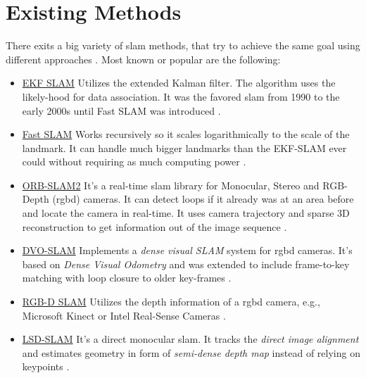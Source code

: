 \section{Existing Methods}
There exits a big variety of \gls{slam} methods, that try to achieve the same goal using different approaches \cite{openslam}.
Most known or popular are the following:
\begin{itemize}
    \item \underline{EKF SLAM} \newline
    Utilizes the extended Kalman filter. The algorithm  uses the likely-hood for data association.
    It was the favored \gls{slam} from 1990 to the early 2000s until Fast SLAM was introduced \cite{Fastslam}. 
    
    \item \underline{Fast SLAM} \newline
    Works recursively so it scales logarithmically to the scale of the landmark. It can handle much bigger landmarks than the EKF-SLAM ever could without requiring as much computing power \cite{Fastslam}. 
    
    \item \underline{ORB-SLAM2} \newline
    It's a real-time \gls{slam} library for Monocular, Stereo and RGB-Depth (\gls{rgbd}) cameras. It can detect loops if it already was at an area before and locate the camera in real-time. It uses camera trajectory and sparse 3D reconstruction to get information out of the image sequence \cite{orbslam}.
    
    \item \underline{DVO-SLAM} \newline
    Implements a \textit{dense visual SLAM} system for \gls{rgbd} cameras. It's based on \textit{Dense Visual Odometry} and was extended to include frame-to-key matching with loop closure to older key-frames \cite{dvoslam1}. 
    
    \item \underline{RGB-D SLAM} \newline
    Utilizes the depth information of a \gls{rgbd} camera, e.g., Microsoft Kinect or Intel Real-Sense Cameras \cite{rosrgbdslam}.
    
    \item \underline{LSD-SLAM} \newline
    It's a direct monocular \gls{slam}. It tracks the \textit{direct image alignment} and estimates geometry in form of \textit{semi-dense depth map} instead of relying on keypoints \cite{lsdslam_eccv}.
\end{itemize}